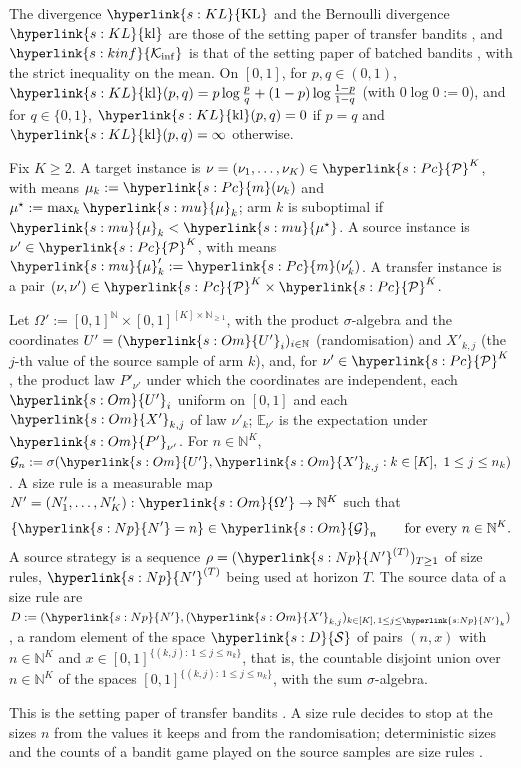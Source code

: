 \documentclass[11pt]{article}
\newcommand{\dt}[1]{\hypertarget{#1}{}}
\newcommand{\sy}[2]{\hyperlink{#1}{#2}}
\newcommand{\E}{\mathbb{E}}
\newcommand{\N}{\mathbb{N}}
\newcommand{\Pc}{\sy{s:Pc}{\mathcal{P}}}
\newcommand{\m}{\sy{s:Pc}{m}}
\newcommand{\KL}{\sy{s:KL}{\mathrm{KL}}}
\newcommand{\kl}{\sy{s:KL}{\mathrm{kl}}}
\newcommand{\Kinf}{\sy{s:kinf}{\mathcal{K}_{\inf}}}
\newcommand{\mean}{\sy{s:mu}{\mu}}
\newcommand{\ms}{\sy{s:mu}{\mu^{\star}}}
\newcommand{\Om}{\sy{s:Om}{\Omega'}}
\newcommand{\Up}{\sy{s:Om}{U'}}
\newcommand{\Xp}{\sy{s:Om}{X'}}
\newcommand{\Pp}{\sy{s:Om}{P'}}
\newcommand{\Gc}{\sy{s:Om}{\mathcal{G}}}
\newcommand{\Np}{\sy{s:Np}{N'}}
\newcommand{\Sd}{\sy{s:D}{\mathcal{S}}}
\begin{document}
The divergence $\KL$ and the Bernoulli divergence $\kl$ are those of
the setting paper of transfer bandits \citep[Definition~3.1]{INC-P003}, and $\Kinf$ is that of the setting paper of batched bandits \citep[Definition~3.2]{INC-P006}, with
the strict inequality on the mean. On $[0,1]$, for $p,q\in(0,1)$,
$\kl(p,q)=p\log\frac pq+(1-p)\log\frac{1-p}{1-q}$ (with $0\log0:=0$), and for $q\in\{0,1\}$,
$\kl(p,q)=0$ if $p=q$ and $\kl(p,q)=\infty$ otherwise.

\begin{definition}[Instances]\label{def:instance}
Fix $K\ge2$. A target instance is $\nu=(\nu_1,\dots,\nu_K)\in\Pc^K$, with means
\dt{s:mu}$\mu_k:=\m(\nu_k)$ and $\mu^\star:=\max_k\mean_k$; arm $k$ is suboptimal if
$\mean_k<\ms$. A source instance is $\nu'\in\Pc^K$, with means $\mean'_k:=\m(\nu'_k)$. A transfer
instance is a pair $(\nu,\nu')\in\Pc^K\times\Pc^K$.
\end{definition}

\begin{definition}\label{def:size-rule}
\dt{s:Om}Let $\Omega':=[0,1]^{\N}\times[0,1]^{[K]\times\N_{\ge1}}$, with the product $\sigma$-algebra and the coordinates
$U'=(\Up_i)_{i\in\N}$ (randomisation) and $X'_{k,j}$ (the $j$-th value of the source sample of arm
$k$), and, for $\nu'\in\Pc^K$, the product law $P'_{\nu'}$ under which the coordinates are
independent, each $\Up_i$ uniform on $[0,1]$ and each $\Xp_{k,j}$ of law $\nu'_k$; $\E_{\nu'}$ is
the expectation under $\Pp_{\nu'}$. For $n\in\N^K$, $\mathcal G_n:=\sigma(\Up,\Xp_{k,j}:k\in[K],\
1\le j\le n_k)$. A size rule is a measurable map\dt{s:Np} $N'=(N'_1,\dots,N'_K):\Om\to\N^K$ such
that
\begin{equation*}
\{\Np=n\}\in\Gc_n\qquad\text{for every }n\in\N^K.
\end{equation*}
A source strategy is a sequence $\rho=(\Np^{(T)})_{T\ge1}$ of size rules, $\Np^{(T)}$ being used at
horizon $T$. The source data of a size rule are\dt{s:D} $D:=(\Np,(\Xp_{k,j})_{k\in[K],\,1\le j\le
\Np_k})$, a random element of the space $\Sd$ of pairs $(n,x)$ with $n\in\N^K$ and
$x\in[0,1]^{\{(k,j):\,1\le j\le n_k\}}$, that is, the countable disjoint union over $n\in\N^K$ of
the spaces $[0,1]^{\{(k,j):\,1\le j\le n_k\}}$, with the sum $\sigma$-algebra.
\end{definition}

This is the setting paper of transfer bandits \citep[Definitions~3.3--3.5]{INC-P003}. A size rule decides to stop at the sizes $n$ from
the values it keeps and from the randomisation; deterministic sizes and the counts of a bandit game
played on the source samples are size rules \citep[Lemma~5.3]{INC-P003}.
\end{document}
